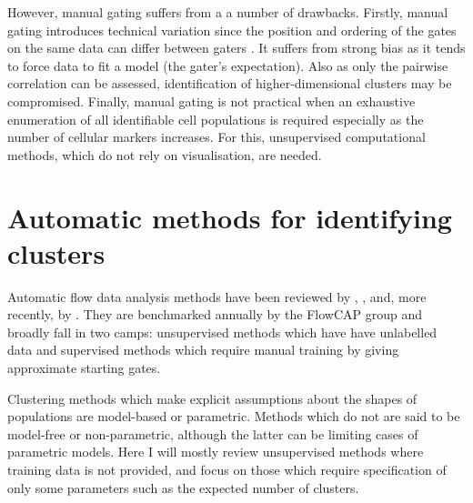 
However, manual gating suffers from a a number of drawbacks.
Firstly, manual gating introduces technical variation since the position and ordering of the gates on the same data can differ between gaters \citep{Maecker:2010fg}.
It suffers from strong bias as it tends to force data to fit a model (the gater's expectation).
Also as only the pairwise correlation can be assessed, identification of higher-dimensional clusters may be compromised.
Finally, manual gating is not practical when an exhaustive enumeration of all identifiable cell populations is required \citep{Siebert:2010iv,Aghaeepour:2012fq} especially as the number of cellular markers increases.
For this, unsupervised computational methods, which do not rely on visualisation, are needed.


\section{Automatic methods for identifying clusters}

Automatic flow data analysis methods have been reviewed by \citet{Bashashati:2009em}, \citet{Lugli:2010ki},
and, more recently, by \citet{Aghaeepour:2013dg}.
They are benchmarked annually by the \gls{FlowCAP} 
group and broadly fall in two camps:
unsupervised methods which have have unlabelled data
and
supervised methods which require manual training by giving approximate starting gates.

Clustering methods which make explicit assumptions about the shapes of populations are model-based or parametric.
Methods which do not are said to be model-free or non-parametric,
although the latter can be limiting cases of parametric models.
Here I will mostly review unsupervised methods where training data is not provided,
and focus on those which require specification of only some parameters such as the expected
number of clusters.

